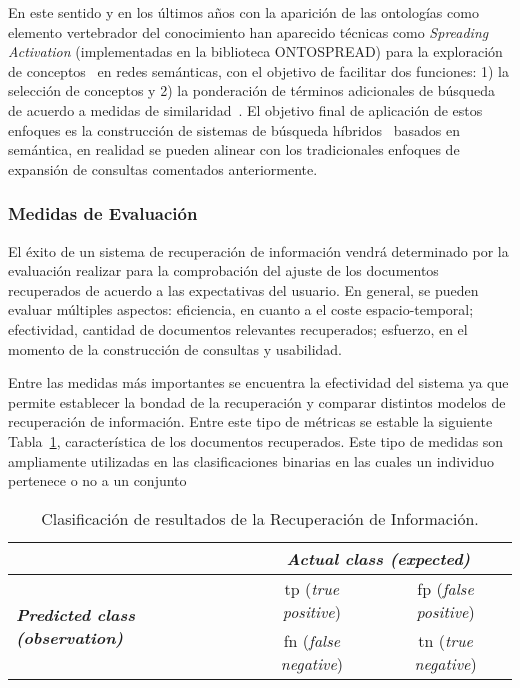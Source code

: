 En este sentido y en los últimos años con la aparición de las ontologías como elemento 
vertebrador del conocimiento han aparecido técnicas como \textit{Spreading Activation} (implementadas en la biblioteca ONTOSPREAD) 
para la exploración de conceptos~\cite{Qiu93,Chen95} en redes semánticas, 
con el objetivo de facilitar dos funciones: 1) la selección de conceptos y 2) la ponderación de términos 
adicionales de búsqueda de acuerdo a medidas de similaridad~\cite{gouws-vanrooyen-engelbrecht:2010:CCSR}. El objetivo 
final de aplicación de estos enfoques es la construcción de sistemas de búsqueda 
híbridos~\cite{bopaEstonia,RochaSA04,conf-sofsem-Suchal08,767402} basados en semántica, en realidad se pueden alinear 
con los tradicionales enfoques de expansión de consultas comentados anteriormente.

\subsubsection{Medidas de Evaluación}
El éxito de un sistema de recuperación de información vendrá 
determinado por la evaluación realizar para la comprobación del ajuste 
de los documentos recuperados de acuerdo a las expectativas del usuario. En general, 
se pueden evaluar múltiples aspectos: eficiencia, en cuanto a el coste 
espacio-temporal; efectividad, cantidad de documentos relevantes recuperados; 
esfuerzo, en el momento de la construcción de consultas y usabilidad. 

Entre las medidas más importantes se encuentra la efectividad del sistema ya que 
permite establecer la bondad de la recuperación y comparar distintos modelos 
de recuperación de información. Entre este tipo de métricas se estable la siguiente 
Tabla~\ref{tabla:pr}, característica de los documentos recuperados. Este tipo de medidas 
son ampliamente utilizadas en las clasificaciones binarias en las cuales un individuo 
pertenece o no a un conjunto

\begin{table}[!htb]
\renewcommand{\arraystretch}{1.3}
\begin{center}
\begin{tabular}{|l|c|c|}
\hline
  &\multicolumn{2}{|c|}{\textbf{\textit{Actual class (expected)}}} \\ \hline
   \multirow{2}{*}{\textbf{\textit{Predicted class (observation)}}}&tp (\textit{true positive})&fp (\textit{false positive}) \\ 
  &fn (\textit{false negative})&tn (\textit{true negative}) \\ \hline
  \hline
  \end{tabular}
  \caption{Clasificación de resultados de la Recuperación de Información.}
  \label{tabla:pr}
  \end{center}
\end{table} 


